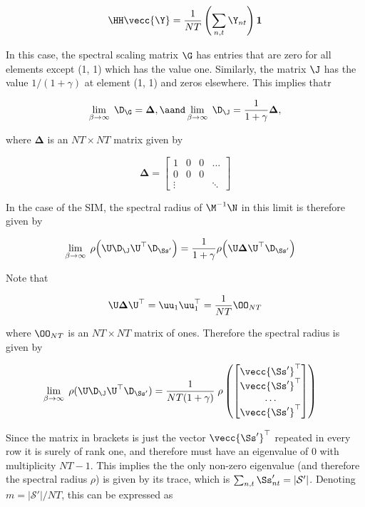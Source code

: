$$
\HH \vecc{\Y} = \frac{1}{NT} \left(\sum_{n, t} \Y_{nt}\right) \mathbf{1}
$$


In this case, the spectral scaling matrix $\G$ has entries that are zero for all elements except (1, 1) which has the value one. Similarly, the matrix $\J$ has the value $1 / (1 + \gamma)$ at element (1, 1) and zeros elsewhere. This implies thatr 


$$
\lim_{\beta \rightarrow \infty} \; \D_\G = \mathbf{\Delta}, \aand \lim_{\beta \rightarrow \infty} \; \D_\J = \frac{1}{1 + \gamma} \mathbf{\Delta}, 
$$

where $\mathbf{\Delta}$ is an $NT \times NT$ matrix given by

$$
\mathbf{\Delta} = \begin{bmatrix}
    1 & 0 & 0 & \dots \\
    0 & 0 & 0 &  \\
    \vdots & & & \ddots
\end{bmatrix}
$$

 In the case of the SIM, the spectral radius of $\M^{-1}\N$ in this limit is therefore given by

\begin{align*}
    \lim_{\beta \rightarrow \infty} \; \rho\Big(\U \D_\J \U^\top \D_{\Ss'} \Big) &= \frac{1}{1 + \gamma} \rho\Big(\U \mathbf{\Delta} \U^\top \D_{\Ss'} \Big)
\end{align*}

Note that 

\begin{equation*}
    \U \mathbf{\Delta} \U^\top = \uu_1 \uu_1^\top  = \frac{1}{NT} \OO_{NT}
\end{equation*}

where $ \OO_{NT}$ is an $NT \times NT$ matrix of ones. Therefore the spectral radius is given by 

\begin{align*}
    \lim_{\beta \rightarrow \infty} \; \rho(\U \D_\J \U^\top \D_{\Ss'}) &= \frac{1}{NT (1 + \gamma) } \; \rho \left( \begin{bmatrix}
        \vecc{\Ss'}^\top \\ \vecc{\Ss'}^\top \\ \dots \\ \vecc{\Ss'}^\top
    \end{bmatrix} \right)
\end{align*}

Since the matrix in brackets is just the vector $\vecc{\Ss'}^\top$ repeated in every row it is surely of rank one, and therefore must have an eigenvalue of 0 with multiplicity $NT - 1$. This implies the the only non-zero eigenvalue (and therefore the spectral radius $\rho$) is given by its trace, which is $\sum_{n, t}\Ss'_{nt} = |\mathcal{S}'|$. Denoting  $m=|\mathcal{S}'|/NT$, this can be expressed as 


